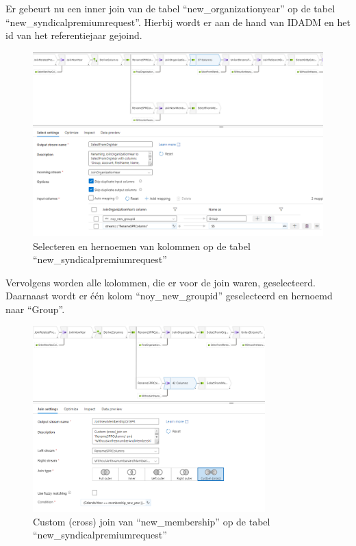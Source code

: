Er gebeurt nu een inner join van de tabel ``new\_organizationyear'' op de tabel ``new\_syndicalpremiumrequest''. Hierbij wordt er aan de hand van IDADM en het id van het referentiejaar gejoind.

\begin{figure}[H]
    \centering
    \includegraphics[width=1\textwidth]{./graphics/adf/bepalen_groep_5.png}
    \caption{Selecteren en hernoemen van kolommen op de tabel ``new\_syndicalpremiumrequest''}
\end{figure}

Vervolgens worden alle kolommen, die er voor de join waren, geselecteerd. Daarnaast wordt er één kolom ``noy\_new\_groupid'' geselecteerd en hernoemd naar ``Group''.

\begin{figure}[H]
    \centering
    \includegraphics[width=0.8\textwidth]{./graphics/adf/bepalen_groep_6.png}
    \caption{Custom (cross) join van ``new\_membership'' op de tabel ``new\_syndicalpremiumrequest''}
\end{figure}


